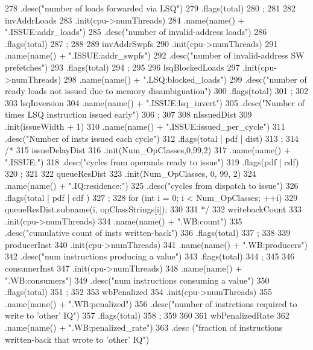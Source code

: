 \begin{DoxyCode}
{278         .desc("number of loads forwarded via LSQ")
279         .flags(total)
280         ;
281 
282     invAddrLoads
283         .init(cpu->numThreads)
284         .name(name() + ".ISSUE:addr_loads")
285         .desc("number of invalid-address loads")
286         .flags(total)
287         ;
288 
289     invAddrSwpfs
290         .init(cpu->numThreads)
291         .name(name() + ".ISSUE:addr_swpfs")
292         .desc("number of invalid-address SW prefetches")
293         .flags(total)
294         ;
295 
296     lsqBlockedLoads
297         .init(cpu->numThreads)
298         .name(name() + ".LSQ:blocked_loads")
299         .desc("number of ready loads not issued due to memory disambiguation")
300         .flags(total)
301         ;
302 
303     lsqInversion
304         .name(name() + ".ISSUE:lsq_invert")
305         .desc("Number of times LSQ instruction issued early")
306         ;
307 
308     nIssuedDist
309         .init(issueWidth + 1)
310         .name(name() + ".ISSUE:issued_per_cycle")
311         .desc("Number of insts issued each cycle")
312         .flags(total | pdf | dist)
313         ;
314 /*
315     issueDelayDist
316         .init(Num_OpClasses,0,99,2)
317         .name(name() + ".ISSUE:")
318         .desc("cycles from operands ready to issue")
319         .flags(pdf | cdf)
320         ;
321 
322     queueResDist
323         .init(Num_OpClasses, 0, 99, 2)
324         .name(name() + ".IQ:residence:")
325         .desc("cycles from dispatch to issue")
326         .flags(total | pdf | cdf )
327         ;
328     for (int i = 0; i < Num_OpClasses; ++i) {
329         queueResDist.subname(i, opClassStrings[i]);
330     }
331 */
332     writebackCount
333         .init(cpu->numThreads)
334         .name(name() + ".WB:count")
335         .desc("cumulative count of insts written-back")
336         .flags(total)
337         ;
338 
339     producerInst
340         .init(cpu->numThreads)
341         .name(name() + ".WB:producers")
342         .desc("num instructions producing a value")
343         .flags(total)
344         ;
345 
346     consumerInst
347         .init(cpu->numThreads)
348         .name(name() + ".WB:consumers")
349         .desc("num instructions consuming a value")
350         .flags(total)
351         ;
352 
353     wbPenalized
354         .init(cpu->numThreads)
355         .name(name() + ".WB:penalized")
356         .desc("number of instrctions required to write to 'other' IQ")
357         .flags(total)
358         ;
359 
360 
361     wbPenalizedRate
362         .name(name() + ".WB:penalized_rate")
363         .desc ("fraction of instructions written-back that wrote to 'other' IQ")
}
\end{DoxyCode}
